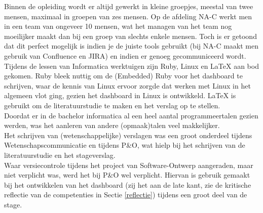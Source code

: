 \documentclass[10pt,a4paper]{article}
\begin{document}
Binnen de opleiding wordt er altijd gewerkt in kleine groepjes, meestal van twee mensen, maximaal in groepen van zes mensen. Op de afdeling NA-C werkt men in een team van ongeveer 10 mensen, wat het managen van het team nog moeilijker maakt dan bij een groep van slechts enkele mensen. Toch is er getoond dat dit perfect mogelijk is indien je de juiste tools gebruikt (bij NA-C maakt men gebruik van Confluence en JIRA) en indien er genoeg gecommuniceerd wordt.\\
Tijdens de lessen van Informatica werktuigen zijn Ruby, Linux en LaTeX aan bod gekomen. Ruby bleek nuttig om de (Embedded) Ruby voor het dashboard te schrijven, waar de kennis van Linux ervoor zorgde dat werken met Linux in het algemeen vlot ging, gezien het dashboard in Linux is ontwikkeld. LaTeX is gebruikt om de literatuurstudie te maken en het verslag op te stellen.\\
Doordat er in de bachelor informatica al een heel aantal programmeertalen gezien werden, was het aanleren van andere (opmaak)talen veel makkelijker. \\
Het schrijven van (wetenschappelijke) verslagen was een groot onderdeel tijdens Wetenschapscommunicatie en tijdens P\&O, wat hielp bij het schrijven van de literatuurstudie en het stageverslag.\\
Waar versiecontrole tijdens het project van Software-Ontwerp aangeraden, maar niet verplicht was, werd het bij P\&O wel verplicht. Hiervan is gebruik gemaakt bij het ontwikkelen van het dashboard (zij het aan de late kant, zie de kritische reflectie van de competenties in Sectie \ref{reflectie}) tijdens een groot deel van de stage. 
\end{document}
